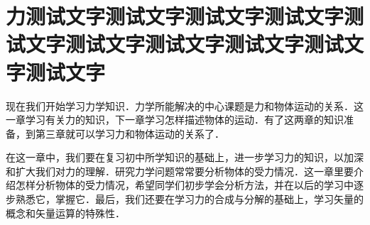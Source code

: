 
\chapter[力]{力测试文字测试文字测试文字测试文字测试文字测试文字测试文字测试文字测试文字测试文字}

现在我们开始学习力学知识．力学所能解决的中心课题是力和物体运动的关系．这一章学习有关力的知识，下一章学习怎样描述物体的运动．有了这两章的知识准备，到第三章就可以学习力和物体运动的关系了．

在这一章中，我们要在复习初中所学知识的基础上，进一步学习力的知识，以加深和扩大我们对力的理解．研究力学问题常常要分析物体的受力情况．这一章里要介绍怎样分析物体的受力情况，希望同学们初步学会分析方法，并在以后的学习中逐步熟悉它，掌握它．最后，我们还要在学习力的合成与分解的基础上，学习矢量的概念和矢量运算的特殊性．



